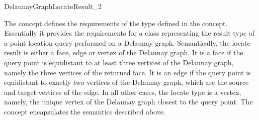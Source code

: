 


\begin{ccRefConcept}{DelaunayGraphLocateResult_2}

\ccDefinition

The concept  defines the requirements of the
 type defined in the 
concept. Essentially it provides the requirements for a class
representing the result type of a point location query performed on a
Delaunay graph. Semantically, the locate result is either a face, edge or
vertex of the Delaunay graph. It is a face if the query point is
equidistant to at least three vertices of the Delaunay graph, namely
the three vertices of the returned face. It is an edge if the query
point is equidistant to exactly two vertices of the Delaunay graph,
which are the source and target vertices of the edge. In all other
cases, the locate type is a vertex, namely, the unique vertex of the
Delaunay graph closest to the query point. The
 concept encapsulates the semantics
described above.

\ccRefines
{}\\
\\
\\

\ccTypes
{}
\ccThreeToTwo
%
\ccGlue
{}
\ccGlue
{}
\ccGlue
{}


\end{ccRefConcept}
